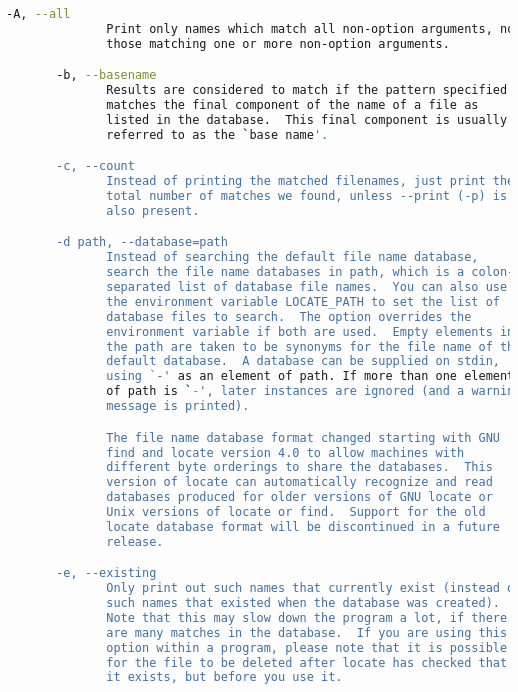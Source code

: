 {{\begin{lstlisting}[language=bash]
       -A, --all
              Print only names which match all non-option arguments, not
              those matching one or more non-option arguments.

       -b, --basename
              Results are considered to match if the pattern specified
              matches the final component of the name of a file as
              listed in the database.  This final component is usually
              referred to as the `base name'.

       -c, --count
              Instead of printing the matched filenames, just print the
              total number of matches we found, unless --print (-p) is
              also present.

       -d path, --database=path
              Instead of searching the default file name database,
              search the file name databases in path, which is a colon-
              separated list of database file names.  You can also use
              the environment variable LOCATE_PATH to set the list of
              database files to search.  The option overrides the
              environment variable if both are used.  Empty elements in
              the path are taken to be synonyms for the file name of the
              default database.  A database can be supplied on stdin,
              using `-' as an element of path. If more than one element
              of path is `-', later instances are ignored (and a warning
              message is printed).

              The file name database format changed starting with GNU
              find and locate version 4.0 to allow machines with
              different byte orderings to share the databases.  This
              version of locate can automatically recognize and read
              databases produced for older versions of GNU locate or
              Unix versions of locate or find.  Support for the old
              locate database format will be discontinued in a future
              release.

       -e, --existing
              Only print out such names that currently exist (instead of
              such names that existed when the database was created).
              Note that this may slow down the program a lot, if there
              are many matches in the database.  If you are using this
              option within a program, please note that it is possible
              for the file to be deleted after locate has checked that
              it exists, but before you use it.


\end{lstlisting}}}
